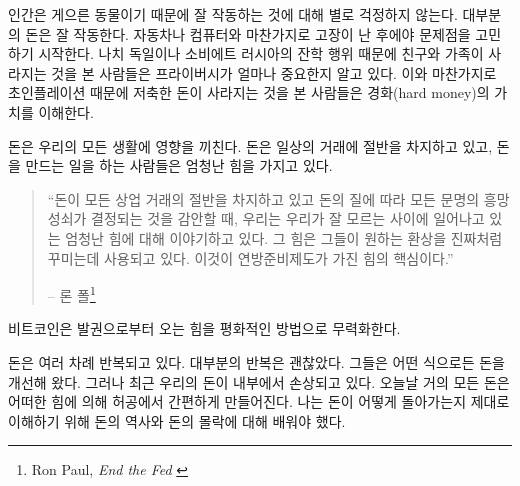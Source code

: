 \begin{comment}
	Being the lazy creatures we are, we don't think too much about things
	which just work. Money, for most of us, works just fine. Like with our
	cars or our computers, most of us are only forced to think about the
	inner workings of these things if they break down. People who saw their
	life-savings vanish because of hyperinflation know the value of hard
	money, just like people who saw their friends and family vanish because
	of the atrocities of Nazi Germany or Soviet Russia know the value of
	privacy.
\end{comment}
인간은 게으른 동물이기 때문에 잘 작동하는 것에 대해 별로 걱정하지 않는다. 
대부분의 돈은 잘 작동한다.
자동차나 컴퓨터와 마찬가지로 고장이 난 후에야 문제점을 고민하기 시작한다. 
나치 독일이나 소비에트 러시아의 잔학 행위 때문에 친구와 가족이 사라지는 것을 본 사람들은 
프라이버시가 얼마나 중요한지 알고 있다.
이와 마찬가지로 초인플레이션 때문에 저축한 돈이 사라지는 것을 본 사람들은 경화(hard money)의 가치를 이해한다.

\begin{comment}
	The thing about money is that it is all-encompassing. Money is half of
	every transaction, which imbues the ones who are in charge with creating
	money with enormous power.
\end{comment}
돈은 우리의 모든 생활에 영향을 끼친다. 
돈은 일상의 거래에 절반을 차지하고 있고, 
돈을 만드는 일을 하는 사람들은 엄청난 힘을 가지고 있다.
\begin{quotation}\begin{samepage}
		\enquote{돈이 모든 상업 거래의 절반을 차지하고 있고
			돈의 질에 따라 모든 문명의 흥망성쇠가 결정되는 것을 감안할 때,
			우리는 우리가 잘 모르는 사이에 일어나고 있는 엄청난 힘에 대해 이야기하고 있다.
			그 힘은 그들이 원하는 환상을 진짜처럼 꾸미는데 사용되고 있다.
			이것이 연방준비제도가 가진 힘의 핵심이다.}
		\begin{flushright} -- 론 폴\footnote{Ron Paul, \textit{End the Fed} \cite{end-the-fed}}
\end{flushright}\end{samepage}\end{quotation}

비트코인은 발권으로부터 오는 힘을 평화적인 방법으로 무력화한다. 


\begin{comment}
	Money went through multiple iterations. Most iterations were good. They
	improved our money in one way or another. Very recently, however, the
	inner workings of our money got corrupted. Today, almost all of our
	money is simply created \textit{out of thin air} by the powers that be. To
	understand how this came to be I had to learn about the history and
	subsequent downfall of money.
\end{comment}
돈은 여러 차례 반복되고 있다. 
대부분의 반복은 괜찮았다. 
그들은 어떤 식으로든 돈을 개선해 왔다.
그러나 최근 우리의 돈이 내부에서 손상되고 있다.
오늘날 거의 모든 돈은 어떠한 힘에 의해 허공에서 간편하게 만들어진다.
나는 돈이 어떻게 돌아가는지 제대로 이해하기 위해 돈의 역사와 돈의 몰락에 대해 배워야 했다.

